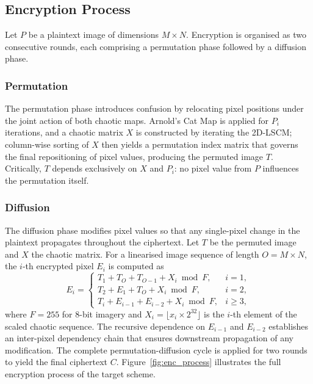 \subsection{Encryption Process}

Let $P$ be a plaintext image of dimensions $M \times N$. Encryption is organised as two consecutive rounds, each comprising a permutation phase followed by a diffusion phase.

\subsubsection{Permutation}

The permutation phase introduces confusion by relocating pixel positions under the joint action of both chaotic maps. Arnold's Cat Map is applied for $P_i$ iterations, and a chaotic matrix $X$ is constructed by iterating the 2D-LSCM; column-wise sorting of $X$ then yields a permutation index matrix that governs the final repositioning of pixel values, producing the permuted image $T$. Critically, $T$ depends exclusively on $X$ and $P_i$: no pixel value from $P$ influences the permutation itself.

\subsubsection{Diffusion}

The diffusion phase modifies pixel values so that any single-pixel change in the plaintext propagates throughout the ciphertext. Let $T$ be the permuted image and $X$ the chaotic matrix. For a linearised image sequence of length $O = M \times N$, the $i$-th encrypted pixel $E_i$ is computed as
\begin{equation}
E_i =
\begin{cases}
T_1 + T_O + T_{O-1} + X_i \bmod F, & i = 1,\\[4pt]
T_2 + E_1 + T_O + X_i \bmod F, & i = 2,\\[4pt]
T_i + E_{i-1} + E_{i-2} + X_i \bmod F, & i \geq 3,
\end{cases}
\label{eq:diffusion_enc}
\end{equation}
where $F = 255$ for 8-bit imagery and $X_i = \lfloor x_i \times 2^{32} \rfloor$ is the $i$-th element of the scaled chaotic sequence. The recursive dependence on $E_{i-1}$ and $E_{i-2}$ establishes an inter-pixel dependency chain that ensures downstream propagation of any modification. The complete permutation-diffusion cycle is applied for two rounds to yield the final ciphertext $C$. Figure~\ref{fig:enc_process} illustrates the full encryption process of the target scheme.

